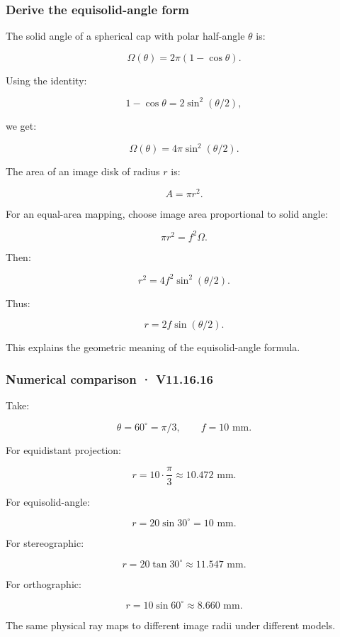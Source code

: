 \subsubsection{Derive the equisolid-angle form}\label{derive-the-equisolid-angle-form}

The solid angle of a spherical cap with polar half-angle \(\theta\) is:

\[ \boxed{ \Omega(\theta)=2\pi(1-\cos\theta). } \]

Using the identity:

\[ 1-\cos\theta=2\sin^2(\theta/2), \]

we get:

\[ \Omega(\theta)=4\pi\sin^2(\theta/2). \]

The area of an image disk of radius \(r\) is:

\[ A=\pi r^2. \]

For an equal-area mapping, choose image area proportional to solid angle:

\[ \pi r^2=f^2\Omega. \]

Then:

\[ r^2=4f^2\sin^2(\theta/2). \]

Thus:

\[ \boxed{ r=2f\sin(\theta/2). } \]

This explains the geometric meaning of the equisolid-angle formula.

\subsubsection{Numerical comparison · V11.16.16}\label{numerical-comparison-v11.16.16}

Take:

\[ \theta=60^\circ=\pi/3, \qquad f=10\text{ mm}. \]

For equidistant projection:

\[ r=10\cdot\frac\pi3 \approx\boxed{10.472\text{ mm}}. \]

For equisolid-angle:

\[ r=20\sin30^\circ =\boxed{10\text{ mm}}. \]

For stereographic:

\[ r=20\tan30^\circ \approx\boxed{11.547\text{ mm}}. \]

For orthographic:

\[ r=10\sin60^\circ \approx\boxed{8.660\text{ mm}}. \]

The same physical ray maps to different image radii under different models.

